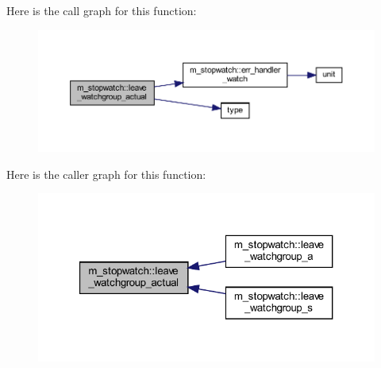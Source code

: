Here is the call graph for this function\+:
\nopagebreak
\begin{figure}[H]
\begin{center}
\leavevmode
\includegraphics[width=350pt]{namespacem__stopwatch_aafa77066f550b13607b7b8dd970ba1b4_cgraph}
\end{center}
\end{figure}
Here is the caller graph for this function\+:
\nopagebreak
\begin{figure}[H]
\begin{center}
\leavevmode
\includegraphics[width=321pt]{namespacem__stopwatch_aafa77066f550b13607b7b8dd970ba1b4_icgraph}
\end{center}
\end{figure}
\mbox{\label{namespacem__stopwatch_a9acf515866a63a203530c03d8fe59b98}} 
